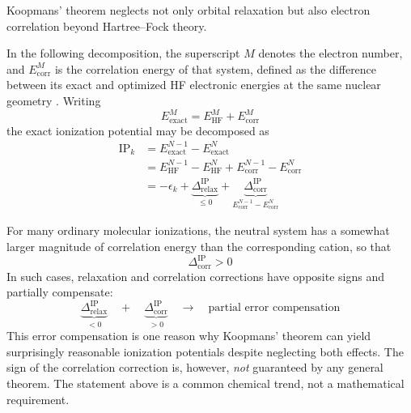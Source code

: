 \documentclass[11pt,a4paper,titlepage]{article}
\numberwithin{equation}{section}
\begin{document}
Koopmans' theorem neglects not only orbital relaxation but also electron
correlation beyond Hartree--Fock theory.

In the following decomposition, the superscript $M$ denotes the electron
number, and $E_\text{corr}^{M}$ is the correlation energy of that system,
defined as the difference between its exact and optimized HF electronic
energies at the same nuclear geometry \citep{Lowdin1959}. Writing
\begin{equation}
  E_\text{exact}^{M}
  =
  E_\text{HF}^{M}
  +
  E_\text{corr}^{M}
\end{equation}
the exact ionization potential may be decomposed as
\begin{equation}
\begin{split}
  \text{IP}_k
  &=
  E_\text{exact}^{N-1}
  -
  E_\text{exact}^{N}
  \\
  &=
  E_\text{HF}^{N-1}
  -
  E_\text{HF}^{N}
  +
  E_\text{corr}^{N-1}
  -
  E_\text{corr}^{N}
  \\
  &=\boxed{
  -\epsilon_k
  +
  \underbrace{
    \Delta_\text{relax}^\text{IP}
  }_{\leq0}
  +
  \underbrace{
    \Delta_\text{corr}^\text{IP}
  }_{
    E_\text{corr}^{N-1}-E_\text{corr}^{N}
  }
  }
  \label{eq:koopmans-ip-corrections}
\end{split}
\end{equation}

For many ordinary molecular ionizations, the neutral system has a somewhat
larger magnitude of correlation energy than the corresponding cation, so
that
\begin{equation}
  \Delta_\text{corr}^\text{IP}>0
\end{equation}
In such cases, relaxation and correlation corrections have opposite signs
and partially compensate:
\begin{equation}
  \underbrace{\Delta_\text{relax}^\text{IP}}_{<0}
  \quad+\quad
  \underbrace{\Delta_\text{corr}^\text{IP}}_{>0}
  \quad\longrightarrow\quad
  \text{partial error compensation}
\end{equation}
This error compensation is one reason why Koopmans' theorem can yield
surprisingly reasonable ionization potentials despite neglecting both
effects.
The sign of the correlation correction is, however, \emph{not} guaranteed
by any general theorem. The statement above is a common chemical trend, not
a mathematical requirement.
\end{document}
